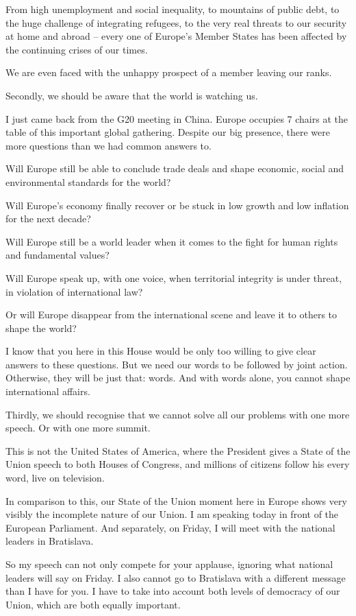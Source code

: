 \documentclass[a4paper,11pt]{article}
\begin{document}
From high unemployment and social inequality, to mountains of public debt, to the huge challenge of integrating refugees, to the very real threats to our security at home and abroad – every one of Europe's Member States has been affected by the continuing crises of our times.

We are even faced with the unhappy prospect of a member leaving our ranks.

Secondly, we should be aware that the world is watching us.

I just came back from the G20 meeting in China. Europe occupies 7 chairs at the table of this important global gathering. Despite our big presence, there were more questions than we had common answers to.

Will Europe still be able to conclude trade deals and shape economic, social and environmental standards for the world?

Will Europe's economy finally recover or be stuck in low growth and low inflation for the next decade?

Will Europe still be a world leader when it comes to the fight for human rights and fundamental values?

Will Europe speak up, with one voice, when territorial integrity is under threat, in violation of international law?

Or will Europe disappear from the international scene and leave it to others to shape the world?

I know that you here in this House would be only too willing to give clear answers to these questions. But we need our words to be followed by joint action. Otherwise, they will be just that: words. And with words alone, you cannot shape international affairs.

Thirdly, we should recognise that we cannot solve all our problems with one more speech. Or with one more summit.

This is not the United States of America, where the President gives a State of the Union speech to both Houses of Congress, and millions of citizens follow his every word, live on television.

In comparison to this, our State of the Union moment here in Europe shows very visibly the incomplete nature of our Union. I am speaking today in front of the European Parliament. And separately, on Friday, I will meet with the national leaders in Bratislava.

So my speech can not only compete for your applause, ignoring what national leaders will say on Friday. I also cannot go to Bratislava with a different message than I have for you. I have to take into account both levels of democracy of our Union, which are both equally important.
\end{document}

